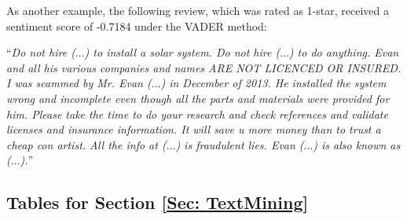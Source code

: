 \documentclass[mnsc,blindrev]{informs3}
\begin{document}
	As another example, the following review, which was rated as 1-star, received a sentiment score of -0.7184 under the VADER method:
	
	``\textit{Do not hire ($\ldots$)  to install a solar system. Do not hire ($\ldots$) to do anything. Evan and all his various companies and names  ARE NOT LICENCED OR INSURED. I was scammed by Mr. Evan ($\ldots$) in December of 2013. He installed the system wrong and incomplete even though all the parts and materials were provided for him. Please take the time to do your research and check references and validate licenses and insurance information. It will save u more money than to trust a cheap con artist. All the info at ($\ldots$)  is fraudulent lies. Evan ($\ldots$) is also known as ($\ldots$).}''

\subsection{Tables for Section \ref{Sec: TextMining}}


	
	

%		
		
		
\end{document}

